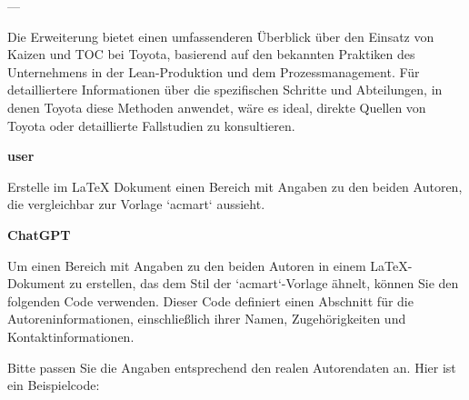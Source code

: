 ---

Die Erweiterung bietet einen umfassenderen Überblick über den Einsatz von Kaizen und TOC bei Toyota, basierend auf den bekannten Praktiken des Unternehmens in der Lean-Produktion und dem Prozessmanagement. Für detailliertere Informationen über die spezifischen Schritte und Abteilungen, in denen Toyota diese Methoden anwendet, wäre es ideal, direkte Quellen von Toyota oder detaillierte Fallstudien zu konsultieren.

\textbf{user}

Erstelle im \LaTeX{} Dokument einen Bereich mit Angaben zu den beiden Autoren, die vergleichbar zur Vorlage `acmart` aussieht.

\textbf{ChatGPT}

Um einen Bereich mit Angaben zu den beiden Autoren in einem \LaTeX{}-Dokument zu erstellen, das dem Stil der `acmart`-Vorlage ähnelt, können Sie den folgenden Code verwenden. Dieser Code definiert einen Abschnitt für die Autoreninformationen, einschließlich ihrer Namen, Zugehörigkeiten und Kontaktinformationen.

Bitte passen Sie die Angaben entsprechend den realen Autorendaten an. Hier ist ein Beispielcode:

